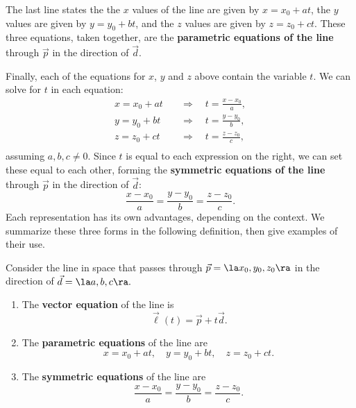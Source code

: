 The last line states the the $x$ values of the line are given by $x=x_0+at$, the $y$ values are given by $y = y_0+bt$, and the $z$ values are given by $z = z_0 + ct$. These three equations, taken together, are the \textbf{parametric equations of the line} through $\vec p$ in the direction of $\vec d$.

Finally, each of the equations for $x$, $y$ and $z$ above contain the variable $t$. We can solve for $t$ in each equation:
\begin{align*}
x = x_0+at \quad&\Rightarrow\quad t=\frac{x-x_0}{a},\\
y=y_0+bt \quad&\Rightarrow\quad t = \frac{y-y_0}{b},\\
z = z_0+ct \quad&\Rightarrow\quad t = \frac{z-z_0}{c},\\
\end{align*}
assuming $a,b,c\neq 0$.
Since $t$ is equal to each expression on the right, we can set these equal to each other, forming the \textbf{symmetric equations of the line} through $\vec p$ in the direction of $\vec d$:
$$\frac{x-x_0}{a} = \frac{y-y_0}{b}=\frac{z-z_0}{c}.$$
Each representation has its own advantages, depending on the context. We summarize these three forms in the following definition, then give examples of their use.

{Consider the line in space that passes through $\vec p = \la x_0,y_0,z_0\ra$ in the direction of $\vec d = \la a,b,c\ra.$
\begin{enumerate}
	\item The \textbf{vector equation} of the line is $$\vec \ell(t) = \vec p+t\vec d.$$
	\item	The \textbf{parametric equations} of the line are
	$$x = x_0+at, \quad y=y_0+bt, \quad z = z_0+ct .$$
	\item	The \textbf{symmetric equations} of the line are
	$$\frac{x-x_0}{a} = \frac{y-y_0}{b}=\frac{z-z_0}{c}.$$
\end{enumerate}}

